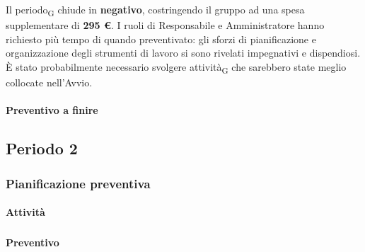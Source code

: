 Il periodo\textsubscript{G} chiude in \textbf{negativo}, costringendo il gruppo ad una spesa supplementare di \textbf{295 \euro}. I ruoli di Responsabile e Amministratore hanno richiesto più tempo di quando preventivato: gli sforzi di pianificazione e organizzazione degli strumenti di lavoro si sono rivelati impegnativi e dispendiosi. \`E stato probabilmente necessario svolgere attività\textsubscript{G} che sarebbero state meglio collocate nell'Avvio.



\paragraph{Preventivo a finire}
\subparagraph*{}

\pafTable{
	
}

\pagebreak
\subsection{Periodo 2}

\subsubsection{Pianificazione preventiva}

\paragraph{Attività}
\subparagraph*{}

\planningTable{
	
}



\paragraph{Preventivo}
\subparagraph*{}

